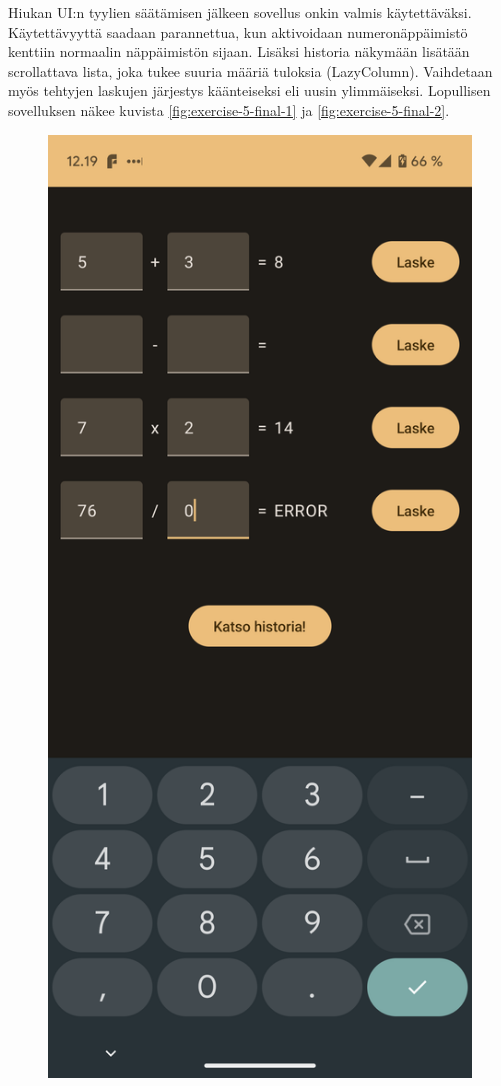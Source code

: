 Hiukan UI:n tyylien säätämisen jälkeen sovellus onkin valmis käytettäväksi.
Käytettävyyttä saadaan parannettua, kun aktivoidaan numeronäppäimistö kenttiin
normaalin näppäimistön sijaan. Lisäksi historia näkymään lisätään scrollattava
lista, joka tukee suuria määriä tuloksia (LazyColumn). Vaihdetaan myös tehtyjen
laskujen järjestys käänteiseksi eli uusin ylimmäiseksi. Lopullisen sovelluksen
näkee kuvista \ref{fig:exercise-5-final-1} ja \ref{fig:exercise-5-final-2}.

\begin{figure}[h!]
\centering
\begin{minipage}[b]{.4\textwidth}
    \includegraphics[width=\textwidth]{figures/exercise-5-final-1.png}

\end{minipage}
\end{figure}
